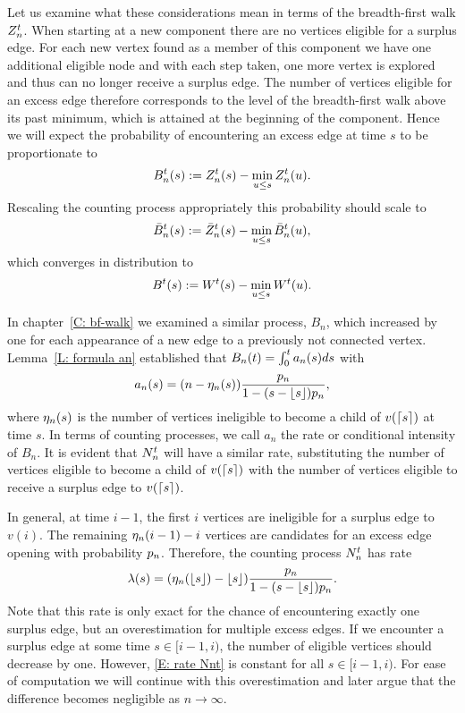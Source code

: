 Let us examine what these considerations mean in terms of the breadth-first walk $Z_n^t$.
When starting at a new component there are no vertices eligible for a surplus edge.
For each new vertex found as a member of this component we have one additional eligible node 
and with each step taken, one more vertex is explored and thus can no longer receive a surplus edge.
The number of vertices eligible for an excess edge therefore corresponds to the level of the breadth-first walk above its past minimum,
which is attained at the beginning of the component.
Hence we will expect the probability of encountering an excess edge at time $s$ to be proportionate to
\begin{equation}
B_n^t(s) := Z_n^t(s) - \min_{u \leq s}Z_n^t(u).
\end{equation}
Rescaling the counting process appropriately this probability should scale to
\begin{equation}
\bar{B}_n^t(s) := \bar{Z}^t_n(s) - \min_{u \leq s}\bar{B}_n^t(u),
\end{equation}
which converges in distribution to
\begin{equation}
B^t(s) := W^t(s) - \min_{u \leq s}W^t(u). 
\end{equation}

In chapter~\ref{C: bf-walk} we examined a similar process, $B_n$, 
which increased by one for each appearance of a new edge to a previously not connected vertex.
Lemma~\ref{L: formula an} established that $B_n(t) = \int_{0}^{t} a_n(s)ds$ with
\begin{equation*}
	a_n(s) = (n - \eta_n(s)) \frac{p_n}{1-(s-\lfloor s\rfloor)p_n},
\end{equation*}
where $\eta_n(s)$ is the number of vertices ineligible to become a child of $v(\lceil s\rceil)$ at time $s$.
In terms of counting processes, we call $a_n$ the rate or conditional intensity of $B_n$.
It is evident that $N_n^t$ will have a similar rate,
substituting the number of vertices eligible to become a child of $v(\lceil s\rceil)$ with the number of vertices eligible to receive a surplus edge to $v(\lceil s\rceil)$.

In general, at time $i-1$, the first $i$ vertices are ineligible for a surplus edge to $v(i)$.
The remaining $\eta_n(i-1) - i$ vertices are candidates for an excess edge opening with probability $p_n$.
Therefore, the counting process $N_n^t$ has rate
\begin{equation} \label{E: rate Nnt}
\lambda(s) = (\eta_n(\lfloor s\rfloor) - \lfloor s\rfloor) \frac{p_n}{1-(s-\lfloor s\rfloor)p_n}.
\end{equation}
Note that this rate is only exact for the chance of encountering exactly one surplus edge, 
but an overestimation for multiple excess edges.
If we encounter a surplus edge at some time $s \in [i-1, i)$,
the number of eligible vertices should decrease by one.
However, \eqref{E: rate Nnt} is constant for all $s \in [i-1, i)$.
For ease of computation we will continue with this overestimation and later argue that the difference becomes negligible as $n \rightarrow \infty$.

